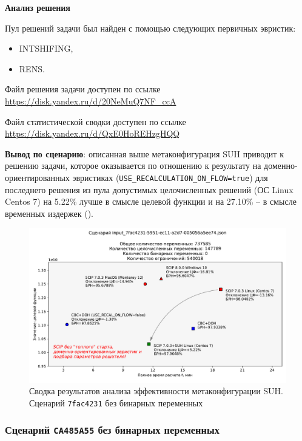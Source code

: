 \documentclass[%
	11pt,
	a4paper,
	utf8,
		]{article}
\begin{document}
\vspace*{5mm}\textbf{Анализ решения}\vspace*{1mm}

Пул решений задачи был найден с помощью следующих первичных эвристик:
\begin{itemize}
	\item INTSHIFING,
	
	\item RENS.
\end{itemize}

Файл решения задачи доступен по ссылке \url{https://disk.yandex.ru/d/20NeMuQ7NF_ccA}

Файл статистической сводки доступен по ссылке \url{https://disk.yandex.ru/d/QxE0HoREHzgHQQ}

\vspace*{3mm}
\textbf{Вывод по сценарию}: описанная выше метаконфигурация SUH приводит к решению задачи, которое оказывается по отношению к результату на доменно-ориентированных эвристиках (\verb|USE_RECALCULATION_ON_FLOW=true|) для последнего решения из пула допустимых целочисленных решений (ОС Linux Centos 7) на 5.22\% лучше в смысле целевой функции и на 27.10\% -- в смысле временных издержек ().

\begin{figure}[!h]
	\centering
	\includegraphics[scale=0.6]{figures/summary_7fac4231.pdf}
	\caption{Сводка результатов анализа эффективности метаконфигурации SUH. \\Сценарий \texttt{7fac4231} без бинарных переменных}\label{fig:summary_7fac4231}
\end{figure}

\subsubsection{Сценарий \texttt{CA485A55} без бинарных переменных}
\end{document}
